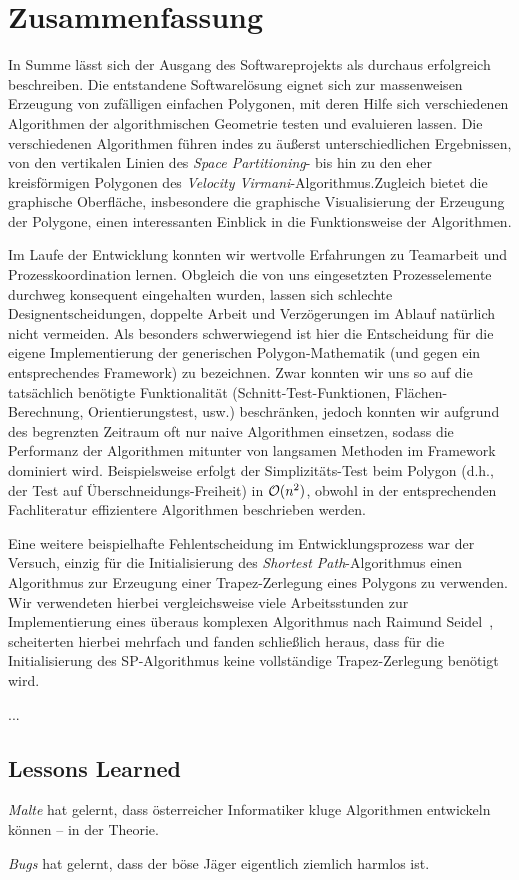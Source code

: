 \section{Zusammenfassung}
In Summe lässt sich der Ausgang des Softwareprojekts als durchaus erfolgreich beschreiben. Die entstandene Softwarelösung eignet sich zur massenweisen Erzeugung von zufälligen einfachen Polygonen, mit deren Hilfe sich verschiedenen Algorithmen der algorithmischen Geometrie testen und evaluieren lassen. Die verschiedenen Algorithmen führen indes zu äußerst unterschiedlichen Ergebnissen, von den vertikalen Linien des \emph{Space Partitioning}- bis hin zu den eher kreisförmigen Polygonen des \emph{Velocity Virmani}-Algorithmus.Zugleich bietet die graphische Oberfläche, insbesondere die graphische Visualisierung der Erzeugung der Polygone, einen interessanten Einblick in die Funktionsweise der Algorithmen. 

Im Laufe der Entwicklung konnten wir wertvolle Erfahrungen zu Teamarbeit und Prozesskoordination lernen. Obgleich die von uns eingesetzten Prozesselemente durchweg konsequent eingehalten wurden, lassen sich schlechte Designentscheidungen, doppelte Arbeit und Verzögerungen im Ablauf natürlich nicht vermeiden. Als besonders schwerwiegend ist hier die Entscheidung für die eigene Implementierung der generischen Polygon-Mathematik (und gegen ein entsprechendes Framework) zu bezeichnen. Zwar konnten wir uns so auf die tatsächlich benötigte Funktionalität (Schnitt-Test-Funktionen, Flächen-Berechnung, Orientierungstest, usw.) beschränken, jedoch konnten wir aufgrund des begrenzten Zeitraum oft nur naive Algorithmen einsetzen, sodass die Performanz der Algorithmen mitunter von langsamen Methoden im Framework dominiert wird. Beispielsweise erfolgt der Simplizitäts-Test beim Polygon (d.h., der Test auf Überschneidungs-Freiheit) in $\mathcal{O}(n^2)$, obwohl in der entsprechenden Fachliteratur effizientere Algorithmen beschrieben werden.

Eine weitere beispielhafte Fehlentscheidung im Entwicklungsprozess war der Versuch, einzig für die Initialisierung des \emph{Shortest Path}-Algorithmus einen Algorithmus zur Erzeugung einer Trapez-Zerlegung eines Polygons zu verwenden. Wir verwendeten hierbei vergleichsweise viele Arbeitsstunden zur Implementierung eines überaus komplexen Algorithmus nach Raimund Seidel~\cite{seidel91asimple}, scheiterten hierbei mehrfach und fanden schließlich heraus, dass für die Initialisierung des SP-Algorithmus keine vollständige Trapez-Zerlegung benötigt wird.

...

\subsection{Lessons Learned}

\begin{lessonlearned}
\emph{Malte} hat gelernt, dass österreicher Informatiker kluge Algorithmen entwickeln können -- in der Theorie.
\end{lessonlearned}

\begin{lessonlearned}
\emph{Bugs} hat gelernt, dass der böse Jäger eigentlich ziemlich harmlos ist.
\end{lessonlearned}
